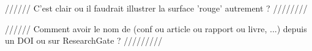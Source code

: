////// C'est clair ou il faudrait illustrer la surface 'rouge' autrement ? ////////

////// Comment avoir le nom de (conf ou article ou rapport ou livre, ...) depuis un DOI ou sur ResearchGate ? /////////

